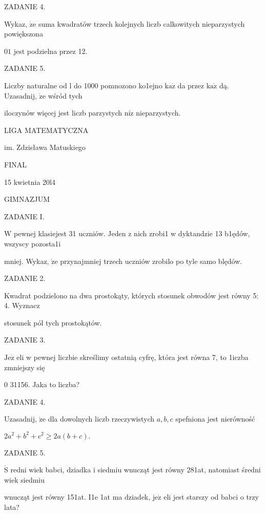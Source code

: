 \documentclass[a4paper,12pt]{article}
\begin{document}
ZADANIE 4.

Wykaz, $\dot{\mathrm{z}}\mathrm{e}$ suma kwadratów trzech kolejnych liczb calkowitych nieparzystych powiększona

$01$ jest podzielna przez 12.

ZADANIE 5.

Liczby naturalne od l do 1000 pomnozono ko1ejno $\mathrm{k}\mathrm{a}\dot{\mathrm{z}}$ da przez $\mathrm{k}\mathrm{a}\dot{\mathrm{z}}$ dą. Uzasadnij, $\dot{\mathrm{z}}\mathrm{e}$ wśród tych

iloczynów więcej jest liczb parzystych $\mathrm{n}\mathrm{i}\dot{\mathrm{z}}$ nieparzystych.






LIGA MATEMATYCZNA

im. Zdzisława Matuskiego

FINAL

15 kwietnia 20l4

GIMNAZJUM

ZADANIE I.

$\mathrm{W}$ pewnej klasiejest 31 uczniów. Jeden z nich zrobi1 w dyktandzie 13 b1ędów, wszyscy pozosta1i

mniej. Wykaz, $\dot{\mathrm{z}}\mathrm{e}$ przynajmniej trzech uczniów zrobilo po tyle samo blędów.

ZADANIE 2.

Kwadrat podzielono na dwa prostokąty, których stosunek obwodów jest równy 5: 4. Wyznacz

stosunek pól tych prostokątów.

ZADANIE 3.

$\mathrm{J}\mathrm{e}\dot{\mathrm{z}}$ eli w pewnej liczbie skreślimy ostatnią cyfrę, która jest równa 7, to 1iczba zmniejszy się

$0$ 31156. Jaka to liczba?

ZADANIE 4.

Uzasadnij, $\dot{\mathrm{z}}\mathrm{e}$ dla dowolnych liczb rzeczywistych $a, b, c$ spefniona jest nierówność

$2a^{2}+b^{2}+c^{2}\geq 2a(b+c).$

ZADANIE 5.

$\acute{\mathrm{S}}$ redni wiek babci, dziadka i siedmiu wnucząt jest równy 281at, natomiast średni wiek siedmiu

wnucząt jest równy 151at. I1e 1at ma dziadek, $\mathrm{j}\mathrm{e}\dot{\mathrm{z}}$ eli jest starszy od babci o trzy lata?
\end{document}
